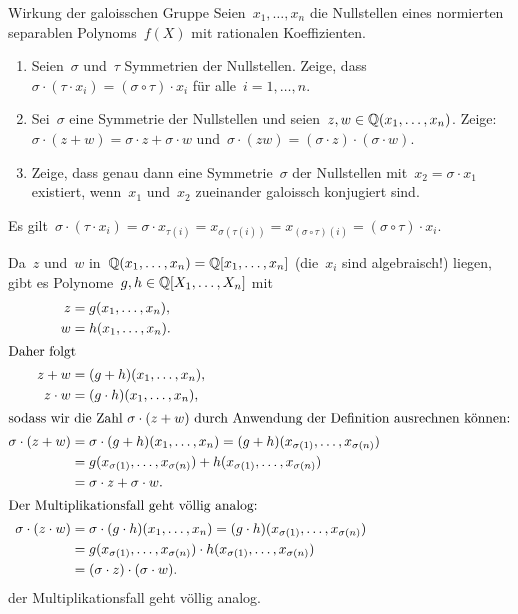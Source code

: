 \documentclass{algblatt}
\begin{document}
\vspace*{-1.5cm}

\begin{aufgabe}{Wirkung der galoisschen Gruppe}
Seien~$x_1,\ldots,x_n$ die Nullstellen eines normierten separablen
Polynoms~$f(X)$ mit rationalen Koeffizienten.
\begin{enumerate}
\item Seien~$\sigma$ und~$\tau$ Symmetrien der Nullstellen. Zeige, dass~$\sigma \cdot
(\tau \cdot x_i) = (\sigma \circ \tau) \cdot x_i$ für alle~$i = 1,\ldots,n$.

\item Sei~$\sigma$ eine Symmetrie der Nullstellen und seien~$z, w \in
\mathbb{Q}(x_1,\ldots,x_n)$. Zeige: $\sigma \cdot (z + w) = \sigma \cdot z + \sigma
\cdot w$ und~$\sigma \cdot (zw) = (\sigma \cdot z) \cdot (\sigma \cdot w)$.

\item Zeige, dass genau dann eine Symmetrie~$\sigma$ der Nullstellen
mit~$x_2 = \sigma \cdot x_1$ existiert, wenn~$x_1$ und~$x_2$ zueinander
galoissch konjugiert sind.
\end{enumerate}

\begin{loesungE}
\item Es gilt~$\sigma \cdot (\tau \cdot x_i) = \sigma \cdot x_{\tau(i)} =
x_{\sigma(\tau(i))} = x_{(\sigma \circ \tau)(i)} = (\sigma \circ \tau) \cdot
x_i$.

\item Da~$z$ und~$w$ in~$\mathbb{Q}(x_1,\ldots,x_n) = \mathbb{Q}[x_1,\ldots,x_n]$ (die~$x_i$
sind algebraisch!) liegen, gibt es Polynome~$g, h
\in \mathbb{Q}[X_1,\ldots,X_n]$ mit
\begin{align*}
  z &= g(x_1,\ldots,x_n), \\
  w &= h(x_1,\ldots,x_n). \\
\intertext{Daher folgt}
  z + w &= (g + h)(x_1,\ldots,x_n), \\
  z \cdot w &= (g \cdot h)(x_1,\ldots,x_n), \\
\intertext{sodass wir die Zahl~$\sigma \cdot (z + w)$ durch Anwendung der
Definition ausrechnen können:}
  \sigma \cdot (z+w) &= \sigma \cdot (g+h)(x_1,\ldots,x_n) =
  (g+h)(x_{\sigma(1)},\ldots,x_{\sigma(n)}) \\
  &= g(x_{\sigma(1)},\ldots,x_{\sigma(n)}) + h(x_{\sigma(1)},\ldots,x_{\sigma(n)}) \\
  &= \sigma \cdot z + \sigma \cdot w. \\
\intertext{Der Multiplikationsfall geht völlig analog:}
  \sigma \cdot (z \cdot w) &= \sigma \cdot (g \cdot h)(x_1,\ldots,x_n) =
  (g \cdot h)(x_{\sigma(1)},\ldots,x_{\sigma(n)}) \\
  &= g(x_{\sigma(1)},\ldots,x_{\sigma(n)}) \cdot h(x_{\sigma(1)},\ldots,x_{\sigma(n)}) \\
  &= (\sigma \cdot z) \cdot (\sigma \cdot w).
\end{align*}
der Multiplikationsfall geht völlig analog.


\end{loesungE}
\end{aufgabe}
\end{document}
